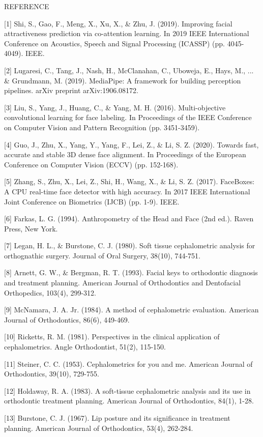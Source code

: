 REFERENCE

[1] Shi, S., Gao, F., Meng, X., Xu, X., & Zhu, J. (2019). Improving facial attractiveness prediction via co-attention learning. In 2019 IEEE International Conference on Acoustics, Speech and Signal Processing (ICASSP) (pp. 4045-4049). IEEE.

[2] Lugaresi, C., Tang, J., Nash, H., McClanahan, C., Uboweja, E., Hays, M., ... & Grundmann, M. (2019). MediaPipe: A framework for building perception pipelines. arXiv preprint arXiv:1906.08172.

[3] Liu, S., Yang, J., Huang, C., & Yang, M. H. (2016). Multi-objective convolutional learning for face labeling. In Proceedings of the IEEE Conference on Computer Vision and Pattern Recognition (pp. 3451-3459).

[4] Guo, J., Zhu, X., Yang, Y., Yang, F., Lei, Z., & Li, S. Z. (2020). Towards fast, accurate and stable 3D dense face alignment. In Proceedings of the European Conference on Computer Vision (ECCV) (pp. 152-168).

[5] Zhang, S., Zhu, X., Lei, Z., Shi, H., Wang, X., & Li, S. Z. (2017). FaceBoxes: A CPU real-time face detector with high accuracy. In 2017 IEEE International Joint Conference on Biometrics (IJCB) (pp. 1-9). IEEE.

[6] Farkas, L. G. (1994). Anthropometry of the Head and Face (2nd ed.). Raven Press, New York.

[7] Legan, H. L., & Burstone, C. J. (1980). Soft tissue cephalometric analysis for orthognathic surgery. Journal of Oral Surgery, 38(10), 744-751.

[8] Arnett, G. W., & Bergman, R. T. (1993). Facial keys to orthodontic diagnosis and treatment planning. American Journal of Orthodontics and Dentofacial Orthopedics, 103(4), 299-312.

[9] McNamara, J. A. Jr. (1984). A method of cephalometric evaluation. American Journal of Orthodontics, 86(6), 449-469.

[10] Ricketts, R. M. (1981). Perspectives in the clinical application of cephalometrics. Angle Orthodontist, 51(2), 115-150.

[11] Steiner, C. C. (1953). Cephalometrics for you and me. American Journal of Orthodontics, 39(10), 729-755.

[12] Holdaway, R. A. (1983). A soft-tissue cephalometric analysis and its use in orthodontic treatment planning. American Journal of Orthodontics, 84(1), 1-28.

[13] Burstone, C. J. (1967). Lip posture and its significance in treatment planning. American Journal of Orthodontics, 53(4), 262-284.

